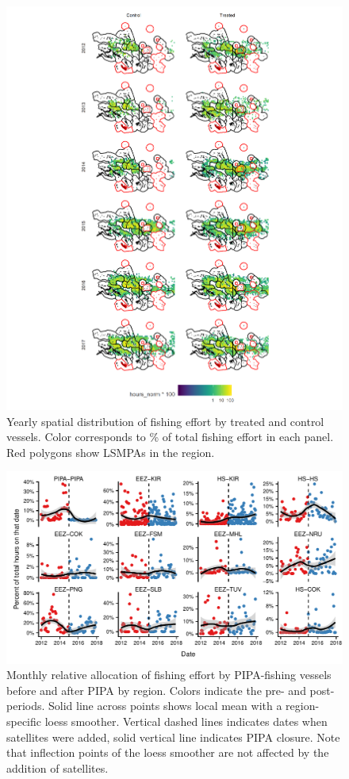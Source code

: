 \documentclass[11pt,english]{article}
\begin{document}
\begin{figure}
\centering
\includegraphics{img/fishing_raster.png}
\caption{\label{fig:fishing_raster}Yearly
spatial distribution of fishing effort by treated and control vessels.
Color corresponds to \% of total fishing effort in each panel.
Red polygons show LSMPAs in the region.}
\end{figure}

\begin{figure}
\centering
\includegraphics{img/redist_trend.pdf}
\caption{\label{fig:redist_trend}Monthly
relative allocation of fishing effort by PIPA-fishing vessels before and
after PIPA by region. Colors indicate the pre- and post- periods. Solid line
across points shows local mean with a region-specific loess smoother.
Vertical dashed lines indicates dates when satellites were added, solid vertical
line indicates PIPA closure. Note that inflection points of
the loess smoother are not affected by the addition of satellites.}
\end{figure}
\end{document}
